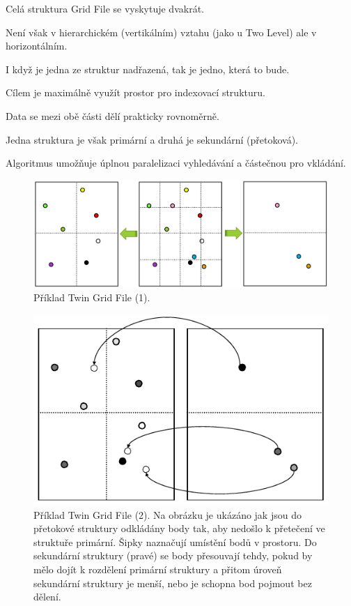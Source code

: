 \begin{compactitem}
    \item Celá struktura Grid File se vyskytuje dvakrát. \begin{compactitem}
        \item Není však v hierarchickém (vertikálním) vztahu (jako u Two Level) ale v horizontálním.
        \item I když je jedna ze struktur nadřazená, tak je jedno, která to bude.
    \end{compactitem}
    \item Cílem je maximálně využít prostor pro indexovací strukturu. \begin{compactitem}
        \item Data se mezi obě části dělí prakticky rovnoměrně.
        \item Jedna struktura je však primární a druhá je sekundární (přetoková).
    \end{compactitem}
    \item Algoritmus umožňuje úplnou paralelizaci vyhledávání a částečnou pro vkládání.
\end{compactitem}

\begin{figure}[H]
    \centering
    \includegraphics[width=0.9\linewidth]{grid_file_twin.pdf}
    \caption{Příklad Twin Grid File (1).}
\end{figure}

\begin{figure}[H]
    \centering
    \includegraphics[width=0.9\linewidth]{grid_file_twin_2.pdf}
    \caption{Příklad Twin Grid File (2). Na obrázku je ukázáno jak jsou do přetokové struktury odkládány body tak, aby nedošlo k přetečení ve struktuře primární. Šipky naznačují umístění bodů v prostoru. Do sekundární struktury (pravé) se body přesouvají tehdy, pokud by mělo dojít k rozdělení primární struktury a přitom úroveň sekundární struktury je menší, nebo je schopna bod pojmout bez dělení.}
\end{figure}

